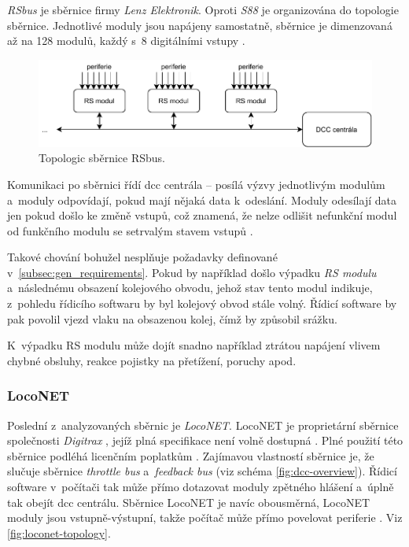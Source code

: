 \textit{RSbus} je sběrnice firmy \textit{Lenz Elektronik}. Oproti \textit{S88}
je organizována do topologie sběrnice. Jednotlivé moduly jsou napájeny
samostatně, sběrnice je dimenzovaná až na 128 modulů, každý s~8 digitálními
vstupy \cite{rs:web} \cite{rs_lib:web}.

\begin{figure}[ht!]
\includegraphics[width=\textwidth]{data/rs.pdf}
\caption{Topologic sběrnice RSbus.}
\label{fig:rs-topology}
\end{figure}

Komunikaci po sběrnici řídí \gls{dcc} centrála – posílá výzvy jednotlivým
modulům a~moduly odpovídají, pokud mají nějaká data k~odeslání. Moduly odesílají
data jen pokud došlo ke změně vstupů, což znamená, že nelze odlišit nefunkční
modul od funkčního modulu se setrvalým stavem vstupů \cite{rs_lib:web}.

Takové chování bohužel nesplňuje požadavky definované
v~\ref{subsec:gen_requirements}. Pokud by například došlo výpadku \textit{RS
modulu} a~následnému obsazení kolejového obvodu, jehož stav tento modul indikuje,
z~pohledu řídicího softwaru by byl kolejový obvod stále volný. Řídicí software
by pak povolil vjezd vlaku na obsazenou kolej, čímž by způsobil srážku.

K~výpadku RS modulu může dojít snadno například ztrátou napájení vlivem chybné
obsluhy, reakce pojistky na přetížení, poruchy apod.

\subsubsection{LocoNET}

Poslední z~analyzovaných sběrnic je \textit{LocoNET}. LocoNET je
proprietární sběrnice společnosti \textit{Digitrax} \cite{loconet:web}, jejíž
plná specifikace není volně dostupná \cite{loconet_license:web}.  Plné použití
této sběrnice podléhá licenčním poplatkům \cite{loconet_license:web}.
Zajímavou vlastností sběrnice je, že slučuje sběrnice \textit{throttle bus}
a~\textit{feedback bus} (viz schéma \ref{fig:dcc-overview}). Řídicí software
v~počítači tak může přímo dotazovat moduly zpětného hlášení a~úplně tak obejít
\gls{dcc} centrálu. Sběrnice LocoNET je navíc obousměrná,
LocoNET moduly jsou vstupně-výstupní, takže počítač může přímo
povelovat periferie \cite{loconet:web}. Viz \ref{fig:loconet-topology}.

